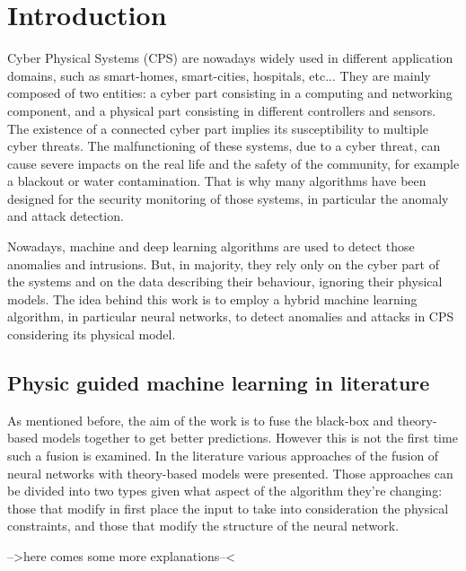 \chapter{Introduction} \label{chap:intro}

Cyber Physical Systems (CPS) are nowadays widely used in different application domains, such as smart-homes, smart-cities, hospitals, etc... They are mainly composed of two entities: a cyber part consisting in a computing and networking component, and a physical part consisting in different controllers and sensors. The existence of a connected cyber part implies its susceptibility to multiple cyber threats. The malfunctioning of these systems, due to a cyber threat, can cause severe impacts on the real life and the safety of the community, for example a blackout or water contamination. That is why many algorithms have been designed for the security monitoring of those systems, in particular the anomaly and attack detection.

Nowadays, machine and deep learning algorithms are used to detect those anomalies and intrusions. But, in majority, they rely only on the cyber part of the systems and on the data describing their behaviour, ignoring their physical models. The idea behind this work is to employ a hybrid machine learning algorithm, in particular neural networks, to detect anomalies and attacks in CPS considering its physical model.

\section{Physic guided machine learning in literature}

As mentioned before, the aim of the work is to fuse the black-box and theory-based models together to get better predictions. However this is not the first time such a fusion is examined. In the literature various approaches of the fusion of neural networks with theory-based models were presented. Those approaches can be divided into two types given what aspect of the algorithm they're changing: those that modify in first place the input to take into consideration the physical constraints, and those that modify the structure of the neural network.

-->here comes some more explanations--<


